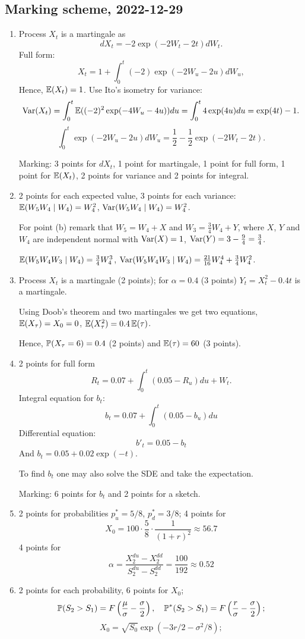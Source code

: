 \documentclass[12pt, a4paper]{article}
\begin{document}
\subsection{Marking scheme, 2022-12-29}

\begin{enumerate}
  \item Process $X_t$ is a martingale as
  \[
    dX_t = -2 \exp(-2W_t - 2t) dW_t.
  \]
  Full form:
  \[
  X_t = 1 + \int_0^t (-2)\exp(-2W_u - 2u) dW_u,  
  \]
  Hence, $\E(X_t) = 1$.
  Use Ito's isometry for variance:
  \[
    \Var(X_t) = \int_0^t \E ((-2)^2 \exp(-4W_u-4u)) du = \int_0^t 4\exp(4u) du = \exp(4t) - 1.
  \]
  \[
    \int_0^t \exp(-2W_u - 2u) dW_u = \frac{1}{2} - \frac{1}{2} \exp(-2W_t - 2t).
  \]

  Marking: 3 points for $dX_t$, 1 point for martingale, 1 point for full form, 1 point for $\E(X_t)$, 2 points for variance and 2 points for integral.

  \item 2 points for each expected value, 3 points for each variance:
  $\E(W_5 W_4 \mid W_4) = W_4^2$, $\Var(W_5 W_4 \mid W_4) = W_4^2$.

For point (b) remark that $W_5 = W_4 + X$ and $W_3 = \frac{3}{4}W_4 + Y$,
where $X$, $Y$ and $W_4$ are independent normal with $\Var(X) = 1$, $\Var(Y) = 3 - \frac{9}{4} = \frac{3}{4}$.

  $\E(W_5 W_4 W_3 \mid W_4) = \frac{3}{4}W_4^3$, $\Var(W_5 W_4 W_3 \mid W_4) = \frac{21}{16}W_4^4 + \frac{3}{4}W_4^2$.
  
  \item Process $X_t$ is a martingale (2 points); for $\alpha = 0.4$ (3 points) $Y_t =X_t^2 - 0.4t$ is a martingale.
  
  Using Doob's theorem and two martingales we get two equations, $\E(X_{\tau}) = X_0 = 0$,
  $\E(X_{\tau}^2) = 0.4 \E(\tau)$.

  Hence, $\P(X_{\tau} = 6)=0.4$ (2 points) and $\E(\tau)=60$ (3 points).
  \item 2 points for full form
  \[
    R_t = 0.07 + \int_0^t (0.05 - R_u) du + W_t.
  \]
  Integral equation for $b_t$:
  \[
  b_t = 0.07 + \int_0^t (0.05 - b_u) du  
  \]
  Differential equation:
  \[
  b'_t = 0.05 - b_t  
  \]
  And $b_t = 0.05 + 0.02 \exp(-t)$. 
  
  To find $b_t$ one may also solve the SDE and take the expectation.

  Marking: 6 points for $b_t$ and 2 points for a sketch.
  \item 2 points for probabilities $p_u^* = 5/8$, $p_d^* = 3/8$;
  4 points for  
  \[
  X_0 = 100 \cdot \frac{5}{8} \cdot \frac{1}{(1+r)^2} \approx 56.7 
  \]
  4 points for 
  \[
  \alpha =   \frac{X_2^{du} - X_2^{dd}}{S_2^{du} - S_2^{dd}} = \frac{100}{192} \approx 0.52
  \]
  \item 2 points for each probability, 6 points for $X_0$;
  \[
  \P(S_2 > S_1) = F\left(\frac{\mu}{\sigma} - \frac{\sigma}{2} \right), \quad   \P^*(S_2 > S_1) = F\left(\frac{r}{\sigma} - \frac{\sigma}{2} \right);
  \]
  \[
  X_0 = \sqrt{S_0} \exp(-3r/2 - \sigma^2/8);  
  \]

\end{enumerate}
\end{document}
